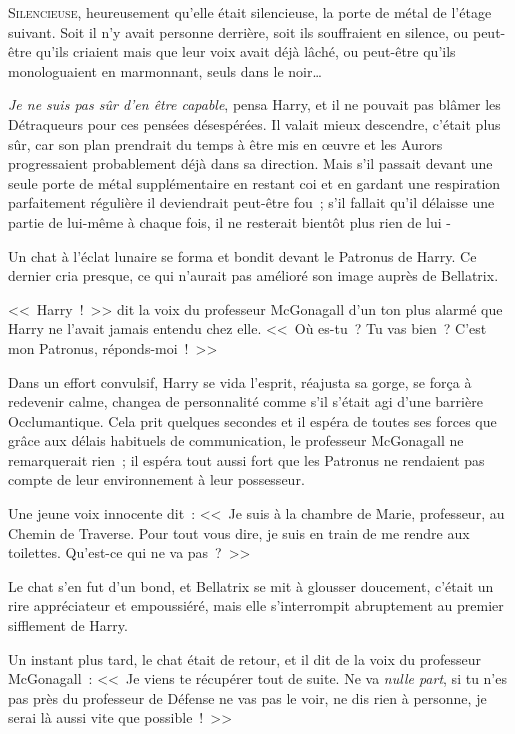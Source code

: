 
\lettrine{S}{ilencieuse}, heureusement qu'elle était silencieuse, la porte de métal de l'étage suivant. Soit il n'y avait personne derrière, soit ils souffraient en silence, ou peut-être qu'ils criaient mais que leur voix avait déjà lâché, ou peut-être qu'ils monologuaient en marmonnant, seuls dans le noir…

\emph{Je ne suis pas sûr d'en être capable}, pensa Harry, et il ne pouvait pas blâmer les Détraqueurs pour ces pensées désespérées. Il valait mieux descendre, c'était plus sûr, car son plan prendrait du temps à être mis en œuvre et les Aurors progressaient probablement déjà dans sa direction. Mais s'il passait devant une seule porte de métal supplémentaire en restant coi et en gardant une respiration parfaitement régulière il deviendrait peut-être fou~; s'il fallait qu'il délaisse une partie de lui-même à chaque fois, il ne resterait bientôt plus rien de lui -

Un chat à l'éclat lunaire se forma et bondit devant le Patronus de Harry. Ce dernier cria presque, ce qui n'aurait pas amélioré son image auprès de Bellatrix.

<<~Harry~!~>> dit la voix du professeur McGonagall d'un ton plus alarmé que Harry ne l'avait jamais entendu chez elle. <<~Où es-tu~? Tu vas bien~? C'est mon Patronus, réponds-moi~!~>>

Dans un effort convulsif, Harry se vida l'esprit, réajusta sa gorge, se força à redevenir calme, changea de personnalité comme s'il s'était agi d'une barrière Occlumantique. Cela prit quelques secondes et il espéra de toutes ses forces que grâce aux délais habituels de communication, le professeur McGonagall ne remarquerait rien~; il espéra tout aussi fort que les Patronus ne rendaient pas compte de leur environnement à leur possesseur.

Une jeune voix innocente dit~: <<~Je suis à la chambre de Marie, professeur, au Chemin de Traverse. Pour tout vous dire, je suis en train de me rendre aux toilettes. Qu'est-ce qui ne va pas~?~>>

Le chat s'en fut d'un bond, et Bellatrix se mit à glousser doucement, c'était un rire appréciateur et empoussiéré, mais elle s'interrompit abruptement au premier sifflement de Harry.

Un instant plus tard, le chat était de retour, et il dit de la voix du professeur McGonagall~: <<~Je viens te récupérer tout de suite. Ne va \emph{nulle part}, si tu n'es pas près du professeur de Défense ne vas pas le voir, ne dis rien à personne, je serai là aussi vite que possible~!~>>

